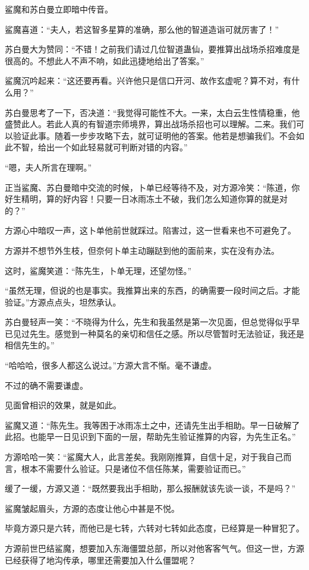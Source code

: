 \begin{this_body}
鲨魔和苏白曼立即暗中传音。

鲨魔喜道：“夫人，若这智多星算的准确，那么他的智道造诣可就厉害了！”

苏白曼大为赞同：“不错！之前我们请过几位智道蛊仙，要推算出战场杀招难度是很高的。不想此人不声不响，如此迅捷地给出了答案。”

鲨魔沉吟起来：“这还要再看。兴许他只是信口开河、故作玄虚呢？算不对，有什么用？”

苏白曼思考了一下，否决道：“我觉得可能性不大。一来，太白云生性情稳重，他盛赞此人。若此人真的有智道宗师境界，算出战场杀招也可以理解。二来。我们可以验证此事。随着一步步攻略下去，就可证明他的答案。他若是想骗我们。不会如此不智，给出一个如此轻易就可判断对错的内容。”

“嗯，夫人所言在理啊。”

正当鲨魔、苏白曼暗中交流的时候，卜单已经等待不及，对方源冷笑：“陈道，你好生精明，算的好内容！只要一日冰雨冻土不破，我们怎么知道你算的就是对的？”

方源心中暗叹一声，这卜单他前世就踩过。陷害过，这一世看来也不可避免了。

方源并不想节外生枝，但奈何卜单主动蹦跶到他的面前来，实在没有办法。

这时，鲨魔笑道：“陈先生，卜单无理，还望勿怪。”

“虽然无理，但说的也是事实。我推算出来的东西，的确需要一段时间之后。才能验证。”方源点点头，坦然承认。

苏白曼轻声一笑：“不晓得为什么，先生和我虽然是第一次见面，但总觉得似乎早已见过先生。感觉到一种莫名的亲切和信任之感。所以尽管暂时无法验证，我还是相信先生的。”

“哈哈哈，很多人都这么说过。”方源大言不惭。毫不谦虚。

不过的确不需要谦虚。

见面曾相识的效果，就是如此。

鲨魔又道：“陈先生。我等困于冰雨冻土之中，还请先生出手相助。早一日破解了此招。也能早一日见识到下面的一层，帮助先生验证推算的内容，为先生正名。”

方源哈哈一笑：“鲨魔大人，此言差矣。我刚刚推算，自信十足，对于我自己而言，根本不需要什么验证。只是诸位不信任陈某，需要验证而已。”

缓了一缓，方源又道：“既然要我出手相助，那么报酬就该先谈一谈，不是吗？”

鲨魔皱起眉头，方源的态度让他心中甚是不悦。

毕竟方源只是六转，而他已是七转，六转对七转如此态度，已经算是一种冒犯了。

方源前世巴结鲨魔，想要加入东海僵盟总部，所以对他客客气气。但这一世，方源已经获得了地沟传承，哪里还需要加入什么僵盟呢？


\end{this_body}
